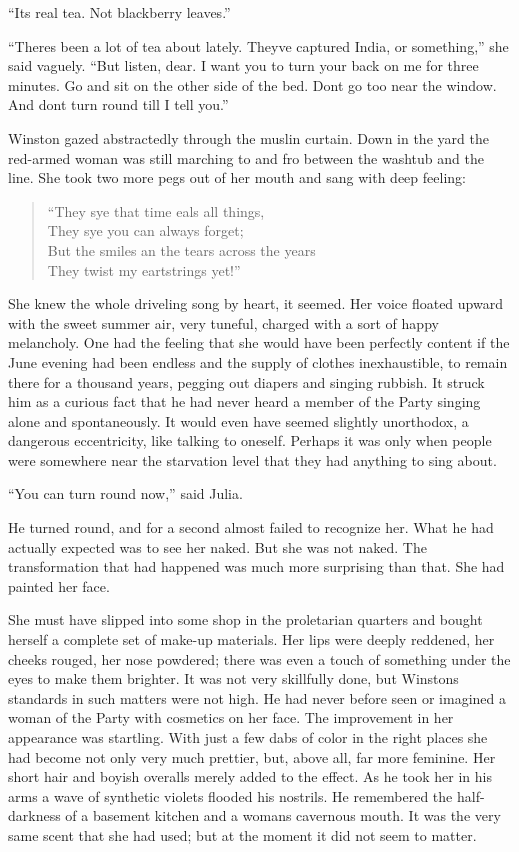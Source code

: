 ``It\textquotesingle s real tea. Not blackberry leaves.''

``There\textquotesingle s been a lot of tea about lately.
They\textquotesingle ve captured India, or something,'' she said vaguely.
``But listen, dear. I want you to turn your back on me for three minutes.
Go and sit on the other side of the bed. Don\textquotesingle t go too
near the window. And don\textquotesingle t turn round till I tell you.''

Winston gazed abstractedly through the muslin curtain. Down in the yard
the red-armed woman was still marching to and fro between the washtub
and the line. She took two more pegs out of her mouth and sang with deep
feeling:

\begin{quotation}
  ``They sye that time \textquotesingle eals all things,\\
  They sye you can always forget;\\
  But the smiles an the tears across the years\\
  They twist my \textquotesingle eartstrings yet!''
\end{quotation}

She knew the whole driveling song by heart, it seemed. Her voice floated
upward with the sweet summer air, very tuneful, charged with a sort of
happy melancholy. One had the feeling that she would have been perfectly
content if the June evening had been endless and the supply of clothes
inexhaustible, to remain there for a thousand years, pegging out diapers
and singing rubbish. It struck him as a curious fact that he had never
heard a member of the Party singing alone and spontaneously. It would
even have seemed slightly unorthodox, a dangerous eccentricity, like
talking to oneself. Perhaps it was only when people were somewhere near
the starvation level that they had anything to sing about.

``You can turn round now,'' said Julia.

He turned round, and for a second almost failed to recognize her. What
he had actually expected was to see her naked. But she was not naked.
The transformation that had happened was much more surprising than that.
She had painted her face.

She must have slipped into some shop in the proletarian quarters and
bought herself a complete set of make-up materials. Her lips were deeply
reddened, her cheeks rouged, her nose powdered; there was even a touch
of something under the eyes to make them brighter. It was not very
skillfully done, but Winston\textquotesingle s standards in such matters
were not high. He had never before seen or imagined a woman of the Party
with cosmetics on her face. The improvement in her appearance was
startling. With just a few dabs of color in the right places she had
become not only very much prettier, but, above all, far more feminine.
Her short hair and boyish overalls merely added to the effect. As he
took her in his arms a wave of synthetic violets flooded his nostrils.
He remembered the half-darkness of a basement kitchen and a
woman\textquotesingle s cavernous mouth. It was the very same scent that
she had used; but at the moment it did not seem to matter.

